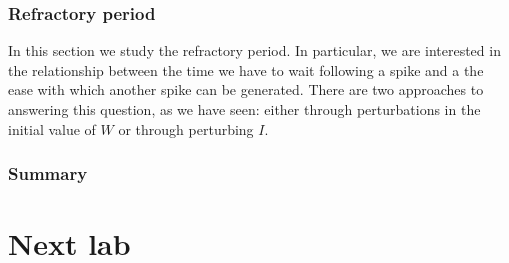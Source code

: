 \documentclass{book}
\theoremstyle{definition}
\begin{document}
\subsection{Refractory period}

In this section we study the refractory period. In particular, we are interested in the relationship between the time we have to wait following a spike and a the ease with which another spike can be generated. There are two approaches to answering this question, as we have seen: either through perturbations in the initial value of $W$ or through perturbing $I$.








\subsection{Summary}





\newpage
 

\chapter{Next lab}
\end{document}
